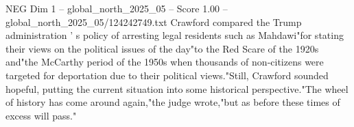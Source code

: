 \begin{textsample}{NEG Dim 1 – global\_north\_2025\_05 – Score 1.00 – global\_north\_2025\_05/124242749.txt}
Crawford compared the Trump administration ' s policy of arresting legal residents such as Mahdawi"for stating their views on the political issues of the day"to the Red Scare of the 1920s and"the McCarthy period of the 1950s when thousands of non-citizens were targeted for deportation due to their political views."Still, Crawford sounded hopeful, putting the current situation into some historical perspective."The wheel of history has come around again,"the judge wrote,"but as before these times of excess will pass."

\end{textsample}
